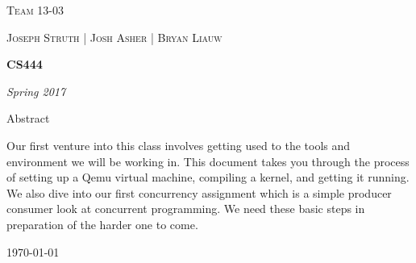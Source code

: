 \documentclass[10pt,draftclsnofoot,onecolumn, compsoc]{IEEEtran}
\begin{document}
\begin{titlepage}
	\centering
	{\scshape\LARGE Team 13-03 \par}
	\vspace{1cm}
	{\scshape\Large Joseph Struth  |  Josh Asher  |   Bryan Liauw\par}
	\vspace{1.5cm}
	{\huge\bfseries CS444\par}
	\vspace{2cm}
	{\Large\itshape Spring 2017\par}
	\vspace{4cm}
	{\large Abstract\par}
	\vspace{1cm}
	Our first venture into this class involves getting used to the tools and environment we will be working in.
	This document takes you through the process of setting up a Qemu virtual machine, compiling a kernel, and 
	getting it running. We also dive into our first concurrency assignment which is a simple producer consumer 
	look at concurrent programming. We need these basic steps in preparation of the harder one to come.
	\vfill

	{\large \today\par}
\end{titlepage}
\end{document}
